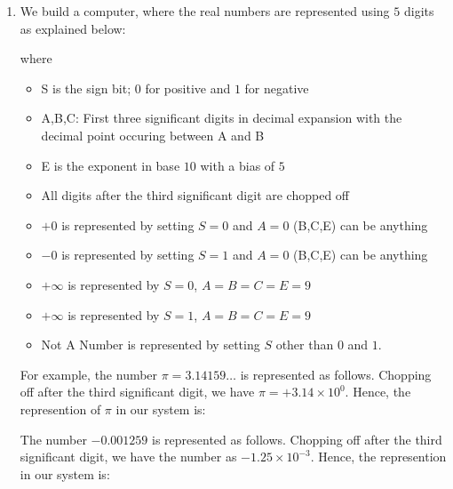 \documentclass{article}
\begin{document}
	\begin{enumerate}
		\item
		We build a computer, where the real numbers are represented using $5$ digits as explained below:
		\begin{center}
		\end{center}
		where
		\begin{itemize}
			\item
			{\color{red}S} is the sign bit; $0$ for positive and $1$ for negative
			\item
			A,B,C: First three significant digits in decimal expansion with the decimal point occuring between A and B
			\item
			E is the exponent in base $10$ with a bias of $5$
			\item
			All digits after the third significant digit are chopped off
			\item
			$+0$ is represented by setting $S=0$ and $A=0$ (B,C,E) can be anything
			\item
			$-0$ is represented by setting $S=1$ and $A=0$ (B,C,E) can be anything
			\item
			$+\infty$ is represented by $S=0$, $A=B=C=E=9$
			\item
			$+\infty$ is represented by $S=1$, $A=B=C=E=9$
			\item
			Not A Number is represented by setting $S$ other than $0$ and $1$.
		\end{itemize}
		For example, the number $\pi=3.14159\ldots$ is represented as follows. Chopping off after the third significant digit, we have $\pi = +3.14 \times 10^0$. Hence, the represention of $\pi$ in our system is:
		\begin{center}
		\end{center}
		The number $-0.001259$ is represented as follows. Chopping off after the third significant digit, we have the number as $-1.25 \times 10^{-3}$. Hence, the represention in our system is:

\end{enumerate}
\end{document}
